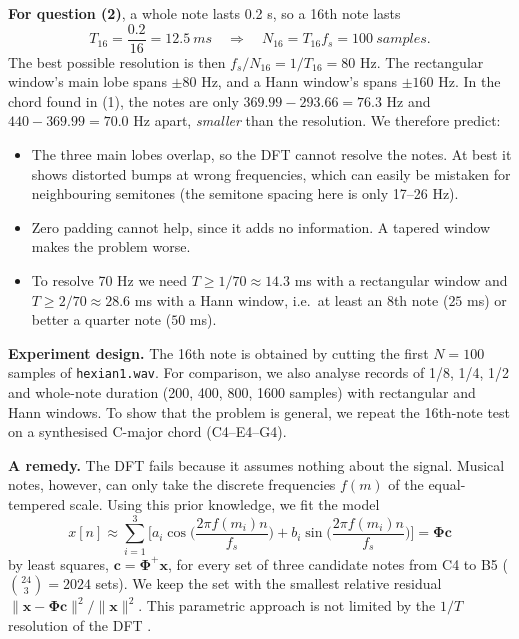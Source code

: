 \documentclass[12pt, a4paper]{article}
\def\text#1{#1}%
\begin{document}
\textbf{For question (2)}, a whole note lasts 0.2 s, so a 16th note lasts
\begin{equation}
    T_{16}=\frac{0.2}{16}=12.5\ \text{ms}\quad\Longrightarrow\quad N_{16}=T_{16}f_s=100\ \text{samples}.
\end{equation}
The best possible resolution is then $f_s/N_{16}=1/T_{16}=80$ Hz. The rectangular window's main lobe spans $\pm80$ Hz, and a Hann window's spans $\pm160$ Hz. In the chord found in (1), the notes are only $369.99-293.66=76.3$ Hz and $440-369.99=70.0$ Hz apart, \emph{smaller} than the resolution. We therefore predict:
\begin{itemize}
    \item The three main lobes overlap, so the DFT cannot resolve the notes. At best it shows distorted bumps at wrong frequencies, which can easily be mistaken for neighbouring semitones (the semitone spacing here is only 17--26 Hz).
    \item Zero padding cannot help, since it adds no information. A tapered window makes the problem worse.
    \item To resolve 70 Hz we need $T\ge1/70\approx14.3$ ms with a rectangular window and $T\ge2/70\approx28.6$ ms with a Hann window, i.e.\ at least an 8th note ($25$ ms) or better a quarter note ($50$ ms).
\end{itemize}

\textbf{Experiment design.} The 16th note is obtained by cutting the first $N=100$ samples of \texttt{hexian1.wav}. For comparison, we also analyse records of 1/8, 1/4, 1/2 and whole-note duration (200, 400, 800, 1600 samples) with rectangular and Hann windows. To show that the problem is general, we repeat the 16th-note test on a synthesised C-major chord (C4--E4--G4).

\textbf{A remedy.} The DFT fails because it assumes nothing about the signal. Musical notes, however, can only take the discrete frequencies $f(m)$ of the equal-tempered scale. Using this prior knowledge, we fit the model
\begin{equation}
    x[n]\approx\sum_{i=1}^{3}\Big[a_i\cos\!\Big(\frac{2\pi f(m_i)n}{f_s}\Big)+b_i\sin\!\Big(\frac{2\pi f(m_i)n}{f_s}\Big)\Big]=\boldsymbol{\Phi}\mathbf{c}
\end{equation}
by least squares, $\mathbf{c}=\boldsymbol{\Phi}^{+}\mathbf{x}$, for every set of three candidate notes from C4 to B5 ($\binom{24}{3}=2024$ sets). We keep the set with the smallest relative residual $\|\mathbf{x}-\boldsymbol{\Phi}\mathbf{c}\|^2/\|\mathbf{x}\|^2$. This parametric approach is not limited by the $1/T$ resolution of the DFT \cite{stoica}.
\end{document}
